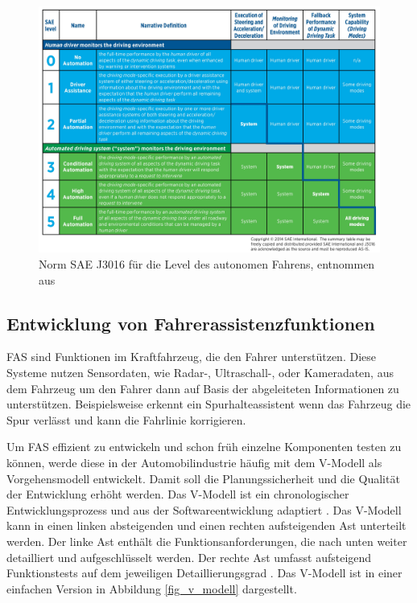 \begin{figure}[h]
\centering
\includegraphics[scale=0.7]{images/level_autonomes_fahren.jpg}
\caption{Norm SAE J3016 für die Level des autonomen Fahrens, entnommen aus \cite{sae2014taxonomy}}
\label{fig_level_autonomes_fahren}
\end{figure}


\subsection{Entwicklung von Fahrerassistenzfunktionen}
\label{grundlagen_fahren_entwicklung}

\ac{FAS} sind Funktionen im Kraftfahrzeug, die den Fahrer unterstützen. Diese Systeme nutzen Sensordaten, wie Radar-, Ultraschall-, oder Kameradaten, aus dem Fahrzeug um den Fahrer dann auf Basis der abgeleiteten Informationen zu unterstützen. Beispielsweise erkennt ein Spurhalteassistent wenn das Fahrzeug die Spur verlässt und kann die Fahrlinie korrigieren. 

Um \ac{FAS} effizient zu entwickeln und schon früh einzelne Komponenten testen zu können, werde diese in der Automobilindustrie häufig mit dem V-Modell als Vorgehensmodell entwickelt. Damit soll die Planungssicherheit und die Qualität der Entwicklung erhöht werden. Das V-Modell ist ein chronologischer Entwicklungsprozess und aus der Softwareentwicklung adaptiert \cite{vmodell2005}. Das V-Modell kann in einen linken absteigenden und einen rechten aufsteigenden Ast unterteilt werden. Der linke Ast enthält die Funktionsanforderungen, die nach unten weiter detailliert und aufgeschlüsselt werden. Der rechte Ast umfasst aufsteigend Funktionstests auf dem jeweiligen Detaillierungsgrad \cite{hakuli2015virtuelle}. Das V-Modell ist in einer einfachen Version in Abbildung \ref{fig_v_modell} dargestellt.

